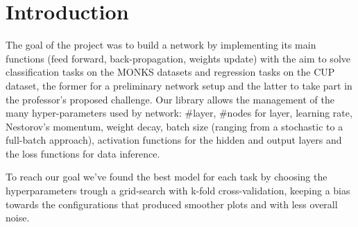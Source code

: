 \section{Introduction}
The goal of the project was to build a network by implementing its main functions (feed forward, back-propagation, weights update) with the aim to solve classification tasks on the MONKS datasets and regression tasks on the CUP dataset, the former for a preliminary network setup and the latter to take part in the professor's proposed challenge. Our library allows the management of the many hyper-parameters used by network: \#layer, \#nodes for layer, learning rate, Nestorov's momentum, weight decay, batch size (ranging from a stochastic to a full-batch approach), activation functions for the hidden and output layers and the loss functions for data inference.
\vspace{3mm}

To reach our goal we've found the best model for each task by choosing the hyperparameters trough a grid-search with k-fold cross-validation, keeping a bias towards the configurations that produced smoother plots and with less overall noise.